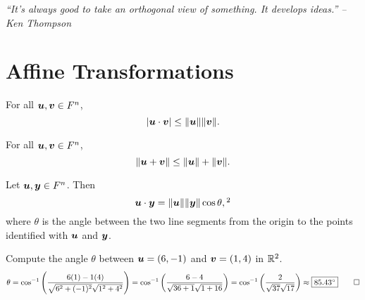 \begin{center} 
\emph{``It's always good to take an orthogonal view of something. It develops ideas.'' -- Ken Thompson}
\end{center}

\section{Affine Transformations}\label{sec:isometry}
\begin{Thm}\label{thm:CauchySchwarz} For all $\boldsymbol u, \boldsymbol v\in F^n$,
\[ |\boldsymbol u \cdot \boldsymbol v| \le \Vert \boldsymbol u\Vert\Vert \boldsymbol v\Vert.\]
\end{Thm}\vs

\begin{multicols}{2}
\begin{Thm}\label{thm:triangleineq} For all $\boldsymbol u, \boldsymbol v\in F^n$, 
\[\Vert \boldsymbol u + \boldsymbol v\Vert  \le \Vert \boldsymbol u \Vert + \Vert \boldsymbol v\Vert.\]
\end{Thm}

\vfill
{}
\end{multicols}
\vs

\begin{Thm}\label{thm:lawcosines} Let $\boldsymbol u, \boldsymbol y\in F^n$. Then 
\[\bb u \cdot \bb y = \Vert \bb u\Vert\Vert \bb y \Vert \cos\theta,\footnotemark[2]\] where $\theta$ is the angle between the two line segments from the origin to the points identified with $\boldsymbol u$ and $\boldsymbol y$.
\end{Thm}\vs

\begin{Exam} Compute the angle $\theta$ between $\boldsymbol u = (6,-1)$ and $\boldsymbol v = (1,4)$ in $\mathbb{R}^2$.
\[\theta = \cos^{-1}\left(\dfrac{6(1)-1(4)}{\sqrt{6^2+(-1)^2}\sqrt{1^2+4^2}}\right) = \cos^{-1}\left(\dfrac{6-4}{\sqrt{36+1}\sqrt{1+16}}\right) =\cos^{-1}\left(\dfrac{2}{\sqrt{37}\sqrt{17}}\right) \approx \fbox{$85.43^\circ$}\qedhere\]
\end{Exam}\vs

